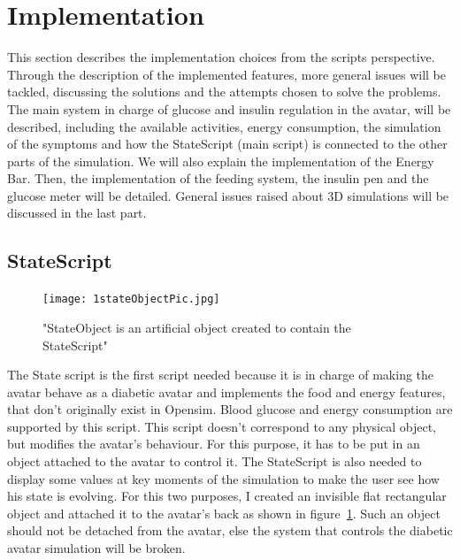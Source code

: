 \section{Implementation}
 This section describes the implementation choices from the scripts perspective. Through the description of the implemented features, more general issues will be tackled, discussing the solutions and the attempts chosen to solve the problems.\\

The main system in charge of glucose and insulin regulation in the avatar, will be described, including the available 
activities, 
energy consumption, the simulation of the 
symptoms and how the StateScript (main script) is 
connected to the other parts of the simulation. We will also explain the implementation of the Energy Bar. Then, the implementation of the 
feeding system, the insulin pen and the glucose meter will be detailed. 
General issues raised about 3D simulations will be discussed in the last part.

\subsection{StateScript}
\label{sec:statescript}

\begin{figure}[h]
  \caption{"StateObject is an artificial object created to contain the StateScript"}
  \centering
  \texttt{[image: 1stateObjectPic.jpg]}
  \label{fig:1stateObjectPic}
\end{figure}

The State script is the first script needed because it is in charge of making the avatar behave as a diabetic avatar and implements the food and energy features, that don't originally exist in Opensim. Blood glucose and energy consumption are supported by this script. %
This script doesn't correspond to any physical object, but modifies the avatar's behaviour. For this purpose, it has to be put in an object attached to the avatar to control it.  
The StateScript is also needed to display some values at key moments of the simulation to make the user see how his state is evolving. For this two purposes, I created an invisible flat rectangular object and attached it to the avatar's back as shown in figure~\ref{fig:1stateObjectPic}. 
%
Such an object should not be detached from the avatar, else the system that controls the diabetic avatar simulation will be broken.

